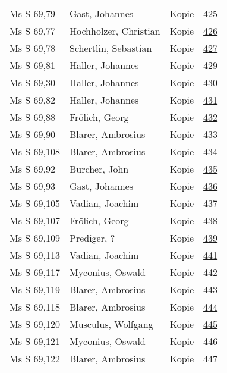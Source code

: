 \documentclass[10pt,a4paper,landscape]{report}
\begin{document}
\begin{longtable}{p{16cm}p{4cm}lr}
Ms S 69,79	&	Gast, Johannes	&	Kopie	&	\href{http://130.60.24.72/assignment/425}{425}\\
Ms S 69,77	&	Hochholzer, Christian	&	Kopie	&	\href{http://130.60.24.72/assignment/426}{426}\\
Ms S 69,78	&	Schertlin, Sebastian	&	Kopie	&	\href{http://130.60.24.72/assignment/427}{427}\\
Ms S 69,81	&	Haller, Johannes	&	Kopie	&	\href{http://130.60.24.72/assignment/429}{429}\\
Ms S 69,30	&	Haller, Johannes	&	Kopie	&	\href{http://130.60.24.72/assignment/430}{430}\\
Ms S 69,82	&	Haller, Johannes	&	Kopie	&	\href{http://130.60.24.72/assignment/431}{431}\\
Ms S 69,88	&	Frölich, Georg	&	Kopie	&	\href{http://130.60.24.72/assignment/432}{432}\\
Ms S 69,90	&	Blarer, Ambrosius	&	Kopie	&	\href{http://130.60.24.72/assignment/433}{433}\\
Ms S 69,108	&	Blarer, Ambrosius	&	Kopie	&	\href{http://130.60.24.72/assignment/434}{434}\\
Ms S 69,92	&	Burcher, John	&	Kopie	&	\href{http://130.60.24.72/assignment/435}{435}\\
Ms S 69,93	&	Gast, Johannes	&	Kopie	&	\href{http://130.60.24.72/assignment/436}{436}\\
Ms S 69,105	&	Vadian, Joachim	&	Kopie	&	\href{http://130.60.24.72/assignment/437}{437}\\
Ms S 69,107	&	Frölich, Georg	&	Kopie	&	\href{http://130.60.24.72/assignment/438}{438}\\
Ms S 69,109	&	Prediger, ?	&	Kopie	&	\href{http://130.60.24.72/assignment/439}{439}\\
Ms S 69,113	&	Vadian, Joachim	&	Kopie	&	\href{http://130.60.24.72/assignment/441}{441}\\
Ms S 69,117	&	Myconius, Oswald	&	Kopie	&	\href{http://130.60.24.72/assignment/442}{442}\\
Ms S 69,119	&	Blarer, Ambrosius	&	Kopie	&	\href{http://130.60.24.72/assignment/443}{443}\\
Ms S 69,118	&	Blarer, Ambrosius	&	Kopie	&	\href{http://130.60.24.72/assignment/444}{444}\\
Ms S 69,120	&	Musculus, Wolfgang	&	Kopie	&	\href{http://130.60.24.72/assignment/445}{445}\\
Ms S 69,121	&	Myconius, Oswald	&	Kopie	&	\href{http://130.60.24.72/assignment/446}{446}\\
Ms S 69,122	&	Blarer, Ambrosius	&	Kopie	&	\href{http://130.60.24.72/assignment/447}{447}\\

\end{longtable}
\end{document}
